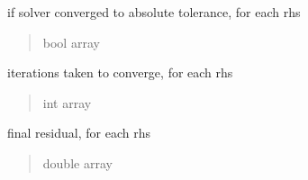 \documentclass[letterpaper,10pt,english]{sphinxmanual}
\begin{document}
\begin{fulllineitems}
\begin{fulllineitems}
\label{\detokenize{_autosummary/nirfasterff.utils.ConvergenceInfo:nirfasterff.utils.ConvergenceInfo.isConvergedToAbsoluteTolerance}}
\pysigstartsignatures
\pysigline
{}
\pysigstopsignatures
\sphinxAtStartPar
if solver converged to absolute tolerance, for each rhs
\begin{quote}\begin{description}
\sphinxAtStartPar
bool array

\end{description}\end{quote}

\end{fulllineitems}


\begin{fulllineitems}
\label{\detokenize{_autosummary/nirfasterff.utils.ConvergenceInfo:nirfasterff.utils.ConvergenceInfo.iteration}}
\pysigstartsignatures
\pysigline
{}
\pysigstopsignatures
\sphinxAtStartPar
iterations taken to converge, for each rhs
\begin{quote}\begin{description}
\sphinxAtStartPar
int array

\end{description}\end{quote}

\end{fulllineitems}


\begin{fulllineitems}
\label{\detokenize{_autosummary/nirfasterff.utils.ConvergenceInfo:nirfasterff.utils.ConvergenceInfo.residual}}
\pysigstartsignatures
\pysigline
{}
\pysigstopsignatures
\sphinxAtStartPar
final residual, for each rhs
\begin{quote}\begin{description}
\sphinxAtStartPar
double array

\end{description}\end{quote}


\end{fulllineitems}
\end{fulllineitems}
\end{document}

